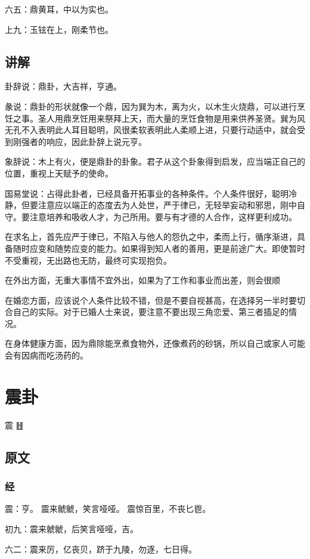\documentclass[12pt,oneside]{book}
\begin{document}
六五：鼎黄耳，中以为实也。

上九：玉铉在上，刚柔节也。

\section{讲解}
卦辞说：鼎卦，大吉祥，亨通。

彖说：鼎卦的形状就像一个鼎，因为巽为木，离为火，以木生火烧鼎，可以进行烹饪之事。圣人用鼎烹饪用来祭拜上天，而大量的烹饪食物是用来供养圣贤。巽为风无孔不入表明此人耳目聪明，风很柔软表明此人柔顺上进，只要行动适中，就会受到刚强者的响应，因此卦辞上说元亨。

象辞说：木上有火，便是鼎卦的卦象。君子从这个卦象得到启发，应当端正自己的位置，重视上天赋予的使命。

国易堂说：占得此卦者，已经具备开拓事业的各种条件。个人条件很好，聪明冷静，但要注意应以端正的态度去为人处世，严于律已，无轻举妄动和邪思，刚中自守。要注意培养和吸收人才，为己所用。要与有才德的人合作，这样更利成功。

在求名上，首先应严于律已，不陷入与他人的怨仇之中，柔而上行，循序渐进，具备随时应变和随势应变的能力。如果得到知人者的善用，更是前途广大。即使暂时不受重视，无出路也无防，最终可实现抱负。

在外出方面，无重大事情不宜外出，如果为了工作和事业而出差，则会很顺

在婚恋方面，应该说个人条件比较不错，但是不要自视甚高，在选择另一半时要切合自己的实际。对于已婚人士来说，要注意不要出现三角恋爱、第三者插足的情况。

在身体健康方面，因为鼎除能烹煮食物外，还像煮药的砂锅，所以自己或家人可能会有因病而吃汤药的。




\chapter{震卦}
震 {\large ䷲}
\section{原文}

\subsection{经}
震：亨。 震来虩虩，笑言哑哑。 震惊百里，不丧匕鬯。

初九：震来虩虩，后笑言哑哑，吉。

六二：震来厉，亿丧贝，跻于九陵，勿逐，七日得。
\end{document}
